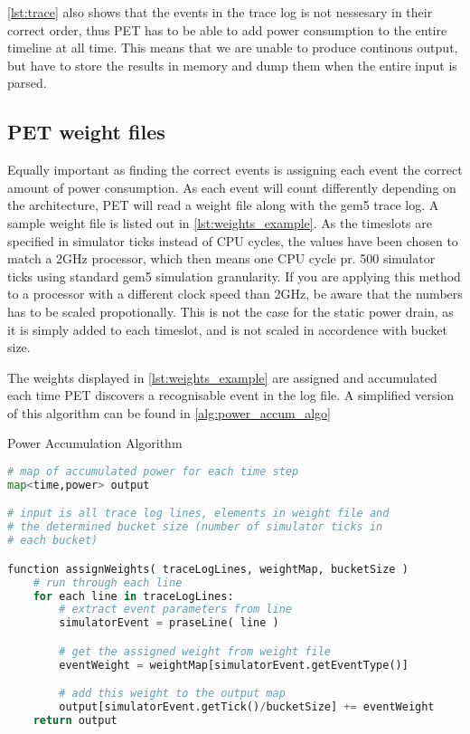 \autoref{lst:trace} also shows that the events in the trace log is not nessesary in their
correct order, thus PET has to be able to add power consumption to the entire timeline at all
time. This means that we are unable to produce continous output, but have to store the
results in memory and dump them when the entire input is parsed.


\subsection{PET weight files}
Equally important as finding the correct events is assigning each event the
correct amount of power consumption. As each event will count differently
depending on the architecture, PET will read a weight file along with the gem5
trace log. A sample weight file is listed out in \autoref{lst:weights_example}.
As the timeslots are specified in simulator ticks instead of CPU cycles,
the values have been chosen to match a 2GHz processor, which then means
one CPU cycle pr. 500 simulator ticks using standard gem5 simulation granularity.
If you are applying this method to a processor with a different clock speed than
2GHz, be aware that the numbers has to be scaled propotionally. This is not the
case for the static power drain, as it is simply added to each timeslot, and is
not scaled in accordence with bucket size.



The weights displayed in \autoref{lst:weights_example} are assigned and
accumulated each time PET discovers a recognisable event in the log file. A
simplified version of this algorithm can be found in
\autoref{alg:power_accum_algo}

\begin{algorithm}
\caption{Power Accumulation Algorithm}
\label{alg:power_accum_algo}
\begin{lstlisting}[language=Python]
# map of accumulated power for each time step
map<time,power> output

# input is all trace log lines, elements in weight file and
# the determined bucket size (number of simulator ticks in
# each bucket)

function assignWeights( traceLogLines, weightMap, bucketSize )
    # run through each line
    for each line in traceLogLines:
        # extract event parameters from line
        simulatorEvent = praseLine( line )

        # get the assigned weight from weight file
        eventWeight = weightMap[simulatorEvent.getEventType()]

        # add this weight to the output map
        output[simulatorEvent.getTick()/bucketSize] += eventWeight
    return output
\end{lstlisting}
\end{algorithm}
%

